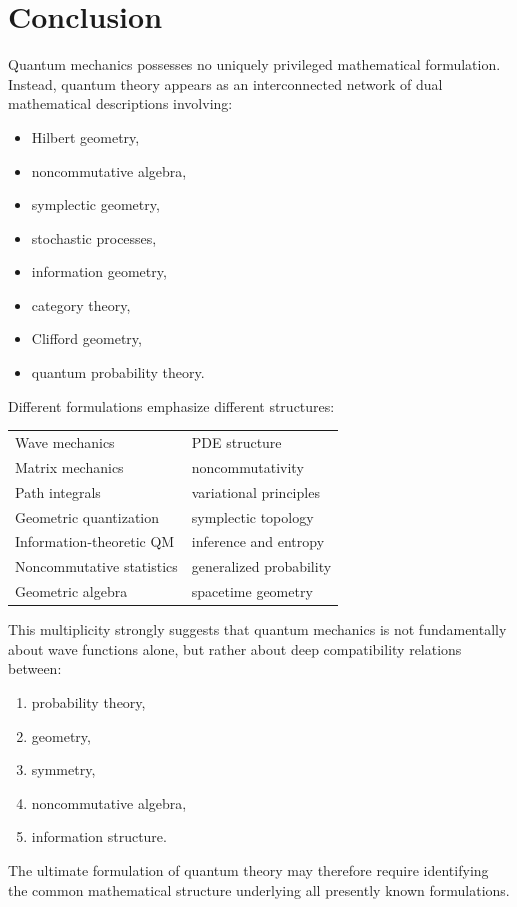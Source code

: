 \section{Conclusion}
Quantum mechanics possesses no uniquely privileged mathematical formulation.
Instead, quantum theory appears as an interconnected network of dual mathematical descriptions involving:
\begin{itemize}
\item Hilbert geometry,
\item noncommutative algebra,
\item symplectic geometry,
\item stochastic processes,
\item information geometry,
\item category theory,
\item Clifford geometry,
\item quantum probability theory.
\end{itemize}
Different formulations emphasize different structures:
\begin{center}
\begin{tabular}{ll}
Wave mechanics & PDE structure \\
Matrix mechanics & noncommutativity \\
Path integrals & variational principles \\
Geometric quantization & symplectic topology \\
Information-theoretic QM & inference and entropy \\
Noncommutative statistics & generalized probability \\
Geometric algebra & spacetime geometry
\end{tabular}
\end{center}
This multiplicity strongly suggests that quantum mechanics is not 
fundamentally about wave functions alone, but rather about deep 
compatibility relations between:
\begin{enumerate}
\item probability theory,
\item geometry,
\item symmetry,
\item noncommutative algebra,
\item information structure.
\end{enumerate}
The ultimate formulation of quantum theory may therefore require
identifying the common mathematical structure underlying all presently
known formulations.
